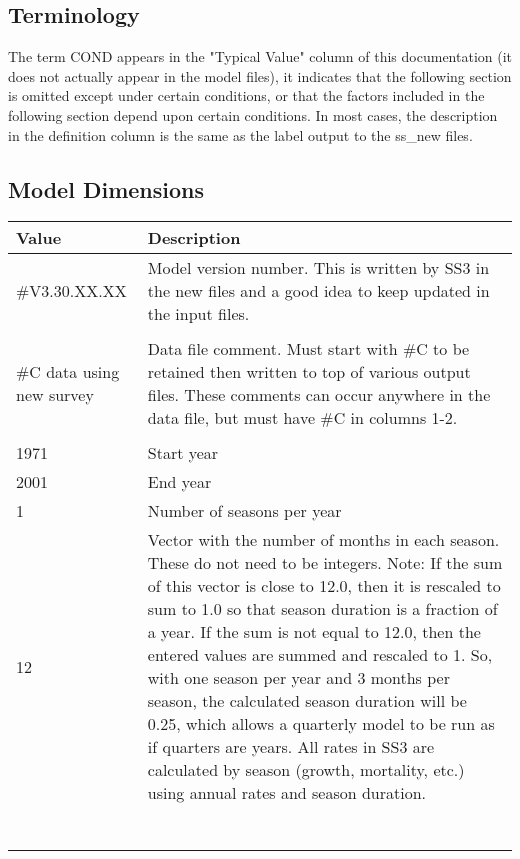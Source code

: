 \subsection{Terminology}
The term COND appears in the "Typical Value" column of this documentation (it does not actually appear in the model files), it indicates that the following section is omitted except under certain conditions, or that the factors included in the following section depend upon certain conditions. In most cases, the description in the definition column is the same as the label output to the ss\_new files.

\subsection{Model Dimensions}
\begin{center}
	\begin{longtable}{p{4cm} p{12cm}}
		\hline
		\textbf{Value} & \textbf{Description} \Tstrut\Bstrut\\
		\hline
		\#V3.30.XX.XX & \multirow{1}{1cm}[-0.1cm]{\parbox{12cm}{Model version number.  This is written by SS3 in the  new files and a good idea to keep updated in the input files.}} \Tstrut\\
		&  \Bstrut\\

		\hline
		\#C data using new survey & \multirow{1}{1cm}[-0.1cm]{\parbox{12cm}{Data file comment. Must start with \#C to be retained then written to top of various output files.  These comments can occur anywhere in the data file, but must have \#C in columns 1-2.}} \Tstrut\\
		&  \Bstrut\\

		\hline
		1971 & Start year \Tstrut\Bstrut\\

		\hline
		2001 & End year \Tstrut\Bstrut\\

		\hline
		1 & Number of seasons per year \Tstrut\Bstrut\\

		\hline
		12 & \multirow{1}{1cm}[-0.1cm]{\parbox{12cm}{Vector with the number of months in each season.  These do not need to be integers.  Note:  If the sum of this vector is close to 12.0, then it is rescaled to sum to 1.0 so that season duration is a fraction of a year.  If the sum is not equal to 12.0, then the entered values are summed and rescaled to 1.  So, with one season per year and 3 months per season, the calculated season duration will be 0.25, which allows a quarterly model to be run as if quarters are years.  All rates in SS3 are  calculated by season (growth, mortality, etc.) using annual rates and season duration.}} \Tstrut\\
		& \\
		& \\
		& \\
		& \\
		& \\
		& \\
		& \Bstrut\\
		

\end{longtable}
\end{center}
